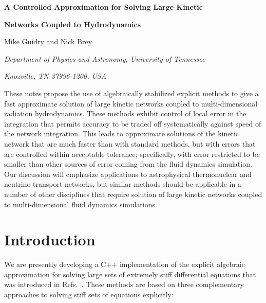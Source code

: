 \documentclass[11pt]{article}
\begin{document}

\centerline{\LARGE\bf A Controlled Approximation for Solving Large Kinetic}
\vspace{1ex}
\centerline{\LARGE\bf Networks Coupled to Hydrodynamics}


\bigskip
\centerline{Mike Guidry and Nick Brey}

\centerline{\small\em Department of Physics and Astronomy, University of 
Tennessee}

\centerline{\small\em Knoxville, TN 37996-1200, USA}



\vspace{7pt}

\begin{small}
\noindent
These notes propose the use of algebraically stabilized explicit methods to 
give a fast approximate solution of large kinetic networks coupled to 
multi-dimensional radiation hydrodynamics.  These methods exhibit control 
of local error in the integration that permits accuracy to be traded off 
systematically against speed of the network integration.  This leads to 
approximate solutions of the kinetic network that are much faster than with 
standard methods, but with errors that are controlled within acceptable 
tolerance; specifically, with error restricted to be smaller 
than other sources of error coming from the fluid dynamics simulation. Our 
discussion 
will emphasize applications to astrophysical thermonuclear and neutrino 
transport 
networks, but similar methods should be applicable in a number of other 
disciplines that require solution of large kinetic networks coupled to 
multi-dimensional fluid dynamics simulations.
\end{small}


\section{\label{intro} Introduction}

We are presently developing a C++ implementation of the explicit algebraic 
approximation for solving large sets of extremely stiff differential equations 
that was introduced in Refs.\ 
\cite{guidJCP,guidAsy,guidQSS,guidPE,brockJCP,haidar2016}. 
These methods are based on three complementary approaches to solving stiff sets 
of equations 
explicitly: 
\end{document}
